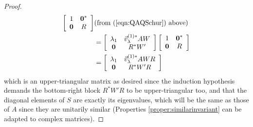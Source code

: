 \begin{proof}
\begin{align}
\left[\begin{array}{cc}
1 & \textbf{0}^* \\
\textbf{0} & R
\end{array}\right] & \text{(from (\ref{eqn:QAQSchur}) above)} \nonumber \\
&=
\left[\begin{array}{cc}
\lambda_1 & \vec{v}_\lambda^{(1)*}AW \\
\textbf{0} & R^*W'
\end{array}\right]
\left[\begin{array}{cc}
1 & \textbf{0}^* \\
\textbf{0} & R
\end{array}\right] \nonumber \\
&=
\left[\begin{array}{cc}
\lambda_1 & \vec{v}_\lambda^{(1)*}AWR \\
\textbf{0} & R^*W'R
\end{array}\right]
\end{align}
which is an upper-triangular matrix as desired since the induction hypothesis demands the bottom-right block $R^*W'R$ to be upper-triangular too, and that the diagonal elements of $S$ are exactly its eigenvalues, which will be the same as those of $A$ since they are unitarily similar (Properties \ref{proper:similarinvariant} can be adapted to complex matrices). 
\end{proof}

